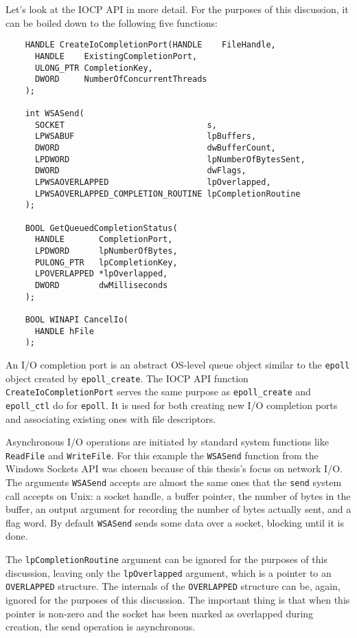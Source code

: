 \documentclass[a4paper,11pt,oneside]{report}
\begin{document}
Let's look at the IOCP API in more detail. For the purposes of this discussion,
it can be boiled down to the following five functions:

\begin{verbatim}
    HANDLE CreateIoCompletionPort(HANDLE    FileHandle,
      HANDLE    ExistingCompletionPort,
      ULONG_PTR CompletionKey,
      DWORD     NumberOfConcurrentThreads
    );

    int WSASend(
      SOCKET                             s,
      LPWSABUF                           lpBuffers,
      DWORD                              dwBufferCount,
      LPDWORD                            lpNumberOfBytesSent,
      DWORD                              dwFlags,
      LPWSAOVERLAPPED                    lpOverlapped,
      LPWSAOVERLAPPED_COMPLETION_ROUTINE lpCompletionRoutine
    );

    BOOL GetQueuedCompletionStatus(
      HANDLE       CompletionPort,
      LPDWORD      lpNumberOfBytes,
      PULONG_PTR   lpCompletionKey,
      LPOVERLAPPED *lpOverlapped,
      DWORD        dwMilliseconds
    );

    BOOL WINAPI CancelIo(
      HANDLE hFile
    );
\end{verbatim}

An I/O completion port is an abstract OS-level queue object similar to the
\texttt{epoll} object created by \texttt{epoll\_create}. The IOCP API function
\texttt{CreateIoCompletionPort} serves the same purpose as
\texttt{epoll\_create} and \texttt{epoll\_ctl} do for \texttt{epoll}. It is used
for both creating new I/O completion ports and associating existing ones with
file descriptors.

Asynchronous I/O operations are initiated by standard system functions like
\texttt{ReadFile} and \texttt{WriteFile}. For this example the \texttt{WSASend}
function from the Windows Sockets API was chosen because of this thesis's focus
on network I/O. The arguments \texttt{WSASend} accepts are almost the same ones
that the \texttt{send} system call accepts on Unix: a socket handle, a buffer
pointer, the number of bytes in the buffer, an output argument for recording the
number of bytes actually sent, and a flag word. By default \texttt{WSASend}
sends some data over a socket, blocking until it is done.

The \texttt{lpCompletionRoutine} argument can be ignored for the purposes of
this discussion, leaving only the \texttt{lpOverlapped} argument, which is a
pointer to an \texttt{OVERLAPPED} structure. The internals of the
\texttt{OVERLAPPED} structure can be, again, ignored for the purposes of this
discussion. The important thing is that when this pointer is non-zero and the
socket has been marked as overlapped during creation, the send operation is
asynchronous.
\end{document}
